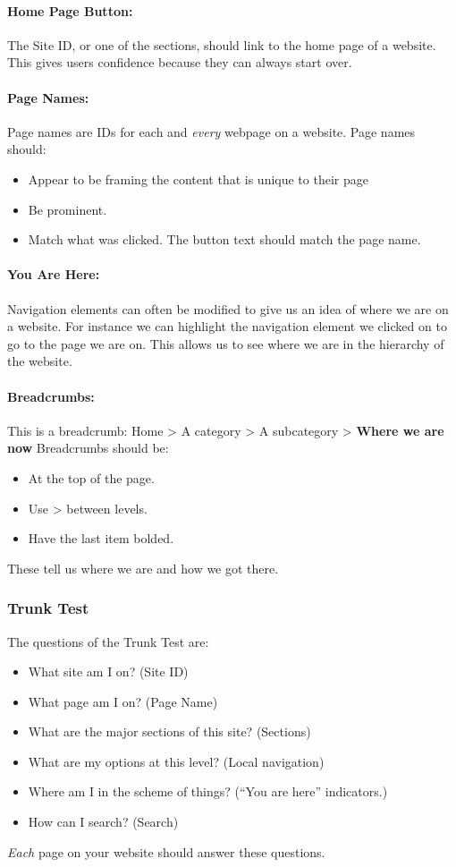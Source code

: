 \documentclass{article}%
\begin{document}
    \paragraph{Home Page Button:}
      The Site ID, or one of the sections, should link to the home page of a website.
      This gives users confidence because they can always start over.
    \paragraph{Page Names:}
      Page names are IDs for each and \emph{every} webpage on a website. \newline
      Page names should:
      \begin{itemize}
        \item Appear to be framing the content that is unique to their page
        \item Be prominent.
        \item Match what was clicked. The button text should match the page name.
      \end{itemize}
    \paragraph{You Are Here:}
      Navigation elements can often be modified to give us an idea of where we are
      on a website. For instance we can highlight the navigation element we clicked
      on to go to the page we are on. This allows us to see where we are in the
      hierarchy of the website.
    \paragraph{Breadcrumbs:}
      This is a breadcrumb: Home > A category > A subcategory > \textbf{Where we are now}
      \newline Breadcrumbs should be:
      \begin{itemize}
        \item At the top of the page.
        \item Use > between levels.
        \item Have the last item bolded.
      \end{itemize}
      These tell us where we are and how we got there.
  \subsubsection{Trunk Test}
    The questions of the Trunk Test are:
    \begin{itemize}
      \item What site am I on? (Site ID)
      \item What page am I on? (Page Name)
      \item What are the major sections of this site? (Sections)
      \item What are my options at this level? (Local navigation)
      \item Where am I in the scheme of things? (``You are here'' indicators.)
      \item How can I search? (Search)
    \end{itemize}
    \emph{Each} page on your website should answer these questions.
\end{document}
